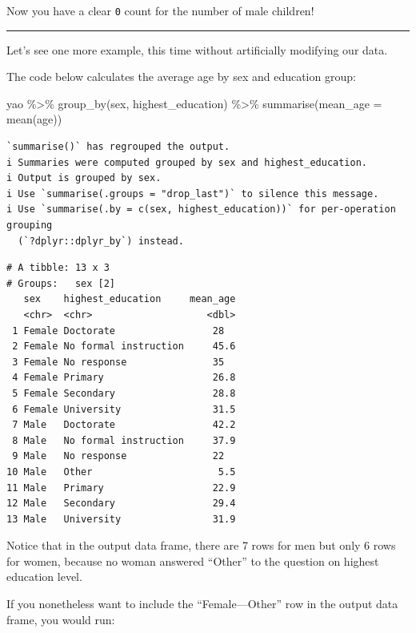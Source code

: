 \documentclass[
  letterpaper,
  DIV=11,
  numbers=noendperiod]{scrreprt}
\newenvironment{Shaded}{\begin{snugshade}}{\end{snugshade}}
\newcommand{\AttributeTok}[1]{\textcolor[rgb]{0.40,0.45,0.13}{#1}}
\newcommand{\FunctionTok}[1]{\textcolor[rgb]{0.28,0.35,0.67}{#1}}
\newcommand{\NormalTok}[1]{\textcolor[rgb]{0.00,0.23,0.31}{#1}}
\newcommand{\SpecialCharTok}[1]{\textcolor[rgb]{0.37,0.37,0.37}{#1}}
\begin{document}
Now you have a clear \texttt{0} count for the number of male children!

\begin{center}\rule{0.5\linewidth}{0.5pt}\end{center}

Let's see one more example, this time without artificially modifying our
data.

The code below calculates the average age by sex and education group:

\begin{Shaded}
\begin{Highlighting}[]
\NormalTok{yao }\SpecialCharTok{\%\textgreater{}\%} 
  \FunctionTok{group\_by}\NormalTok{(sex, highest\_education) }\SpecialCharTok{\%\textgreater{}\%} 
  \FunctionTok{summarise}\NormalTok{(}\AttributeTok{mean\_age =} \FunctionTok{mean}\NormalTok{(age))}
\end{Highlighting}
\end{Shaded}

\begin{verbatim}
`summarise()` has regrouped the output.
i Summaries were computed grouped by sex and highest_education.
i Output is grouped by sex.
i Use `summarise(.groups = "drop_last")` to silence this message.
i Use `summarise(.by = c(sex, highest_education))` for per-operation grouping
  (`?dplyr::dplyr_by`) instead.
\end{verbatim}

\begin{verbatim}
# A tibble: 13 x 3
# Groups:   sex [2]
   sex    highest_education     mean_age
   <chr>  <chr>                    <dbl>
 1 Female Doctorate                 28  
 2 Female No formal instruction     45.6
 3 Female No response               35  
 4 Female Primary                   26.8
 5 Female Secondary                 28.8
 6 Female University                31.5
 7 Male   Doctorate                 42.2
 8 Male   No formal instruction     37.9
 9 Male   No response               22  
10 Male   Other                      5.5
11 Male   Primary                   22.9
12 Male   Secondary                 29.4
13 Male   University                31.9
\end{verbatim}

Notice that in the output data frame, there are 7 rows for men but only
6 rows for women, because no woman answered ``Other'' to the question on
highest education level.

If you nonetheless want to include the ``Female---Other'' row in the
output data frame, you would run:
\end{document}
